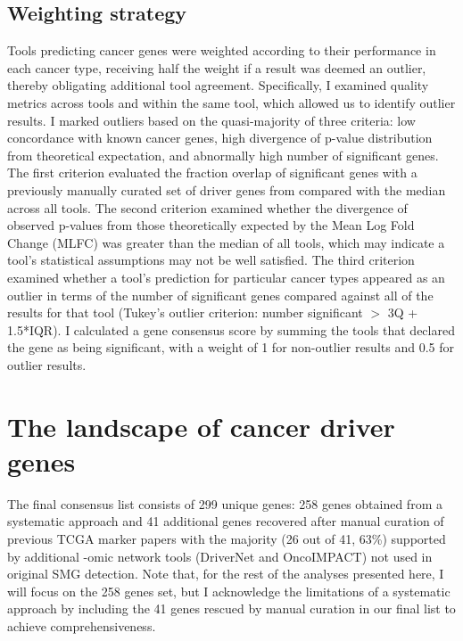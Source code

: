 \subsection{Weighting strategy}
\label{sec:weighting}
Tools predicting cancer genes were weighted according to their performance in each cancer type, receiving half the weight if a result was deemed an outlier, thereby obligating additional tool agreement. Specifically, I examined quality metrics across tools and within the same tool, which allowed us to identify outlier results. I marked outliers based on the quasi-majority of three criteria: low concordance with known cancer genes, high divergence of p-value distribution from theoretical expectation, and abnormally high number of significant genes. The first criterion evaluated the fraction overlap of significant genes with a previously manually curated set of driver genes from \cite{RN25} compared with the median across all tools. The second criterion examined whether the divergence of observed p-values from those theoretically expected by the Mean Log Fold Change (MLFC) \cite{RN70} was greater than the median of all tools, which may indicate a tool's statistical assumptions may not be well satisfied. The third criterion examined whether a tool's prediction for particular cancer types appeared as an outlier in terms of the number of significant genes compared against all of the results for that tool (Tukey's outlier criterion: number significant $>$ 3Q + 1.5*IQR). I calculated a gene consensus score by summing the tools that declared the gene as being significant, with a weight of 1 for non-outlier results and 0.5 for outlier results.

\section{The landscape of cancer driver genes}

The final consensus list consists of 299 unique genes: 258 genes obtained from a systematic approach and 41 additional genes recovered after manual curation of previous TCGA marker papers with the majority (26 out of 41, 63\%) supported by additional -omic network tools (DriverNet and OncoIMPACT) not used in original SMG detection. Note that, for the rest of the analyses presented here, I will focus on the 258 genes set, but I acknowledge the limitations of a systematic approach by including the 41 genes rescued by manual curation in our final list to achieve comprehensiveness.

